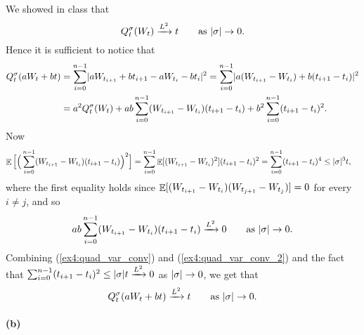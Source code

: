 \documentclass[a4paper,11pt]{article}
\theoremstyle{definition}
\theoremstyle{plain}
\theoremstyle{remark}
\DeclarePairedDelimiter{\abs}{\lvert}{\rvert}
\DeclarePairedDelimiter{\parq}{[}{]}
\DeclareMathOperator*{\expval}{\mathbb{E}}
\begin{document}
We showed in class that
\begin{equation}\label{ex4:quad_var_conv}
Q_t^\sigma(W_t) \xrightarrow{L^2} t \qquad \text{as } \abs{\sigma}\to0.
\end{equation}
Hence it is sufficient to notice that
\begin{align*}
Q_t^\sigma(aW_t+bt) & = \sum_{i=0}^{n-1}\abs{aW_{t_{i+1}}+bt_{i+1}-aW_{t_i}-bt_i}^2 = \sum_{i=0}^{n-1}\abs{a(W_{t_{i+1}}-W_{t_i})+b(t_{i+1}-t_i)}^2 \\ & = a^2Q_t^\sigma(W_t) + ab\sum_{i=0}^{n-1}(W_{t_{i+1}}-W_{t_i})(t_{i+1}-t_i) + b^2\sum_{i=0}^{n-1}(t_{i+1}-t_i)^2.
\end{align*}
Now 
\begin{align*}
\expval\Big[\Big(\sum_{i=0}^{n-1}(W_{t_{i+1}}-W_{t_i})(t_{i+1}-t_i)\Big)^2\Big] & = \sum_{i=0}^{n-1}\expval\parq{(W_{t_{i+1}}-W_{t_i})^2}(t_{i+1}-t_i)^2 = \sum_{i=0}^{n-1}(t_{i+1}-t_i)^4 \leq \abs{\sigma}^3t,
\end{align*}
where the first equality holds since $\expval\parq{(W_{t_{i+1}}-W_{t_i})(W_{t_{j+1}}-W_{t_j})}=0$ for every $i\neq j$, and so
\begin{equation}\label{ex4:quad_var_conv_2}
ab\sum_{i=0}^{n-1}(W_{t_{i+1}}-W_{t_i})(t_{i+1}-t_i) \xrightarrow{L^2} 0 \qquad \text{as } \abs{\sigma}\to0.
\end{equation}
Combining (\ref{ex4:quad_var_conv}) and (\ref{ex4:quad_var_conv_2}) and the fact that $\sum_{i=0}^{n-1}(t_{i+1}-t_i)^2\leq\abs{\sigma}t\xrightarrow{L^2} 0$ as $\abs{\sigma}\to0$, we get that 
$$
Q_t^\sigma(aW_t+bt) \xrightarrow{L^2} t \qquad \text{as } \abs{\sigma}\to0.
$$

\paragraph*{(b)}
\end{document}

